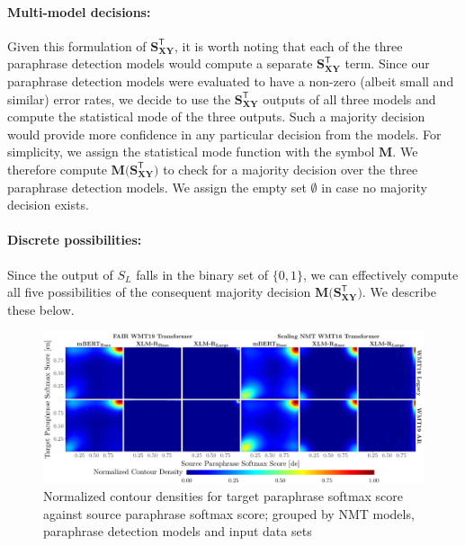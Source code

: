 \documentclass[11pt,a4paper]{article}
\begin{document}
\paragraph{Multi-model decisions:} Given this formulation of $\mathbf{S_{XY}^{\mathsf{T}}}$, it is worth noting that each of the three paraphrase detection models would compute a separate $\mathbf{S_{XY}^{\mathsf{T}}}$ term. Since our paraphrase detection models were evaluated to have a non-zero (albeit small and similar) error rates, we decide to use the $\mathbf{S_{XY}^{\mathsf{T}}}$ outputs of all three models and compute the statistical mode of the three outputs. Such a majority decision would provide more confidence in any particular decision from the models. For simplicity, we assign the statistical mode function with the symbol $\mathbf{M}$. We therefore compute $\mathbf{M(S_{XY}^{\mathsf{T}}})$ to check for a majority decision over the three paraphrase detection models. We assign the empty set $\emptyset$ in case no majority decision exists.

\paragraph{Discrete possibilities:} Since the output of $S_L$ falls in the binary set of $\{0,1\}$, we can effectively compute all five possibilities of the consequent majority decision $\mathbf{M(S_{XY}^{\mathsf{T}}})$. We describe these below.

\begin{figure}
  \centering 
  \includegraphics[trim={0cm 0cm 0cm 0cm},clip,width=\textwidth]{paraphrase_detection_softmax_all.pdf}
  \caption{Normalized contour densities for target paraphrase softmax score against source paraphrase softmax score; grouped by NMT models, paraphrase detection models and input data sets}
  \label{paraphrase_detection_softmax_all}
\end{figure}
\end{document}
